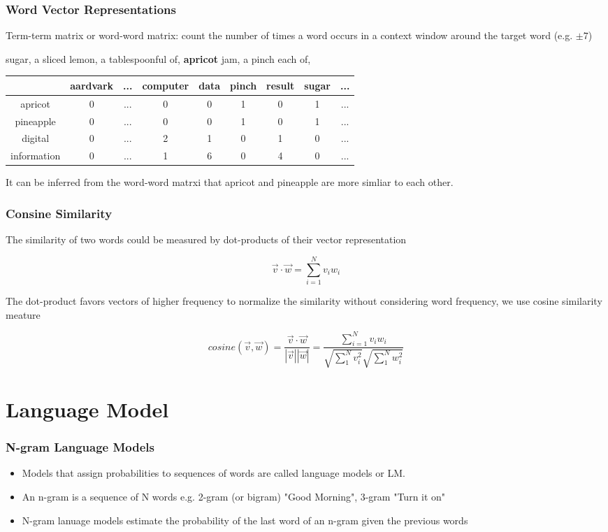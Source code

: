 \documentclass[notheorems, aspectratio=54]{beamer}
\begin{document}
\begin{frame}

\frametitle{Word Vector Representations}
Term-term matrix or word-word matrix: count the number of times a word occurs in a context window around the target word (e.g. $\pm 7$)

sugar, a sliced lemon, a tablespoonful of, {\bfseries apricot} jam, a pinch each of,

\begin{center}
 \begin{tabular}{c c c c c c c c c} 
 \hline
   & aardvark &...& computer & data & pinch & result & sugar & ...\\ [0.5ex] 
 \hline\hline
 apricot & 0 &...& 0 & 0 & 1 & 0 & 1 & ...\\ 
 \hline
 pineapple & 0 &...& 0 & 0 & 1 & 0 & 1 & ...\\
 \hline
 digital  & 0 &...& 2 & 1 & 0 & 1 & 0 & ...\\
 \hline
 information  & 0 &...& 1 & 6 & 0 & 4 & 0 & ... \\
 \hline
\end{tabular}
\end{center}

It can be inferred from the word-word matrxi that apricot and pineapple are more simliar to each other. 

\end{frame}




\begin{frame}
\frametitle{Consine Similarity}

The similarity of two words could be measured by dot-products of their vector representation

$$
\vec{v}\cdot\vec{w}=\sum_{i=1}^N v_i w_i
$$

The dot-product favors vectors of higher frequency to normalize the similarity without considering word frequency, we use cosine similarity meature 

$$
cosine(\vec{v}, \vec{w})=\frac{\vec{v}\cdot\vec{w}}{|\vec{v}||\vec{w}|}=\frac{\sum_{i=1}^N v_i w_i}{\sqrt{\sum_1^N v_i^2}\sqrt{\sum_1^N w_i^2}}
$$


\end{frame}


\section{Language Model}
\begin{frame}
\frametitle{N-gram Language Models}
\begin{itemize}
\item Models that assign probabilities to sequences of words are called language models or LM.
\item An n-gram is a sequence of N words e.g. 2-gram (or bigram) "Good Morning", 3-gram "Turn it on"
\item N-gram lanuage models estimate the probability of the last word of an n-gram given the previous words
\end{itemize}
\end{frame}
\end{document}
